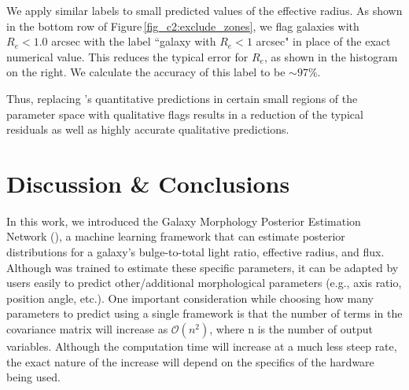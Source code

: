 We apply similar labels to small predicted values of the effective radius. As shown in the bottom row of Figure\,\ref{fig_c2:exclude_zones}, we flag galaxies with $R_e < 1.0$ arcsec with the label ``galaxy with $R_e < 1$ arcsec" in place of the exact numerical value. %
This reduces the typical error for $R_e$, as shown in the histogram on the right. We calculate the accuracy of this label to be $\sim97\%$.

Thus, replacing \gampen's quantitative predictions in certain small regions of the parameter space with qualitative flags results in a reduction of the typical residuals as well as highly accurate qualitative predictions.



\section{Discussion \& Conclusions} \label{sec:conclusions}
In this work, we introduced the Galaxy Morphology Posterior Estimation Network (\gampen{}), a machine learning framework that can estimate posterior distributions for a galaxy's bulge-to-total light ratio, effective radius, and flux. Although \gampen{} was trained to estimate these specific parameters, it can be adapted by users easily to predict other/additional morphological parameters (e.g., axis ratio, position angle, etc.). One important consideration while choosing how many parameters to predict using a single \gampen{} framework is that the number of terms in the covariance matrix will increase as $\mathcal{O}(n^2)$, where n is the number of output variables. Although the computation time will increase at a much less steep rate, the exact nature of the increase will depend on the specifics of the hardware being used.


